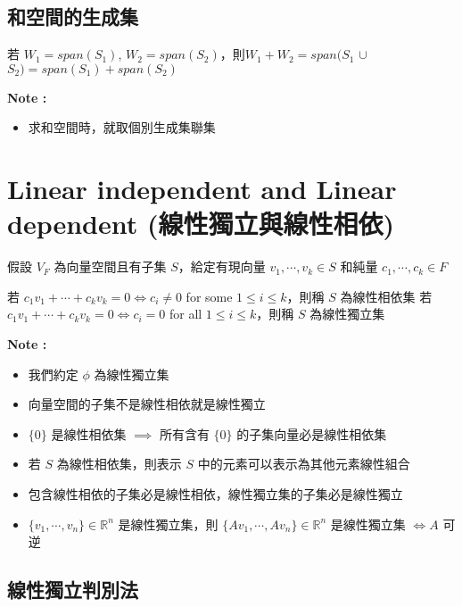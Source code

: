\documentclass[
]{book}
\providecommand{\tightlist}{%
  \setlength{\itemsep}{0pt}\setlength{\parskip}{0pt}}
\begin{document}
\hypertarget{ux548cux7a7aux9593ux7684ux751fux6210ux96c6}{%
\subsection{和空間的生成集}\label{ux548cux7a7aux9593ux7684ux751fux6210ux96c6}}

若 \(W_1 = span(S_1)\), \(W_2 = span(S_2)\)，則\(W_1 + W_2 = span(S_1\) \(\cup\) \(S_2) = span(S_1) + span(S_2)\)

\textbf{Note :}

\begin{itemize}
\tightlist
\item
  求和空間時，就取個別生成集聯集
\end{itemize}

\hypertarget{linear-independent-and-linear-dependent-ux7ddaux6027ux7368ux7acbux8207ux7ddaux6027ux76f8ux4f9d}{%
\section{Linear independent and Linear dependent (線性獨立與線性相依)}\label{linear-independent-and-linear-dependent-ux7ddaux6027ux7368ux7acbux8207ux7ddaux6027ux76f8ux4f9d}}

假設 \(V_F\) 為向量空間且有子集 \(S\)，給定有現向量 \(v_1,\cdots,v_k \in S\) 和純量 \(c_1,\cdots,c_k \in F\)

若 \(c_1v_1 + \cdots + c_kv_k = 0 \iff c_i \neq 0\) for some \(1\leq i \leq k\)，則稱 \(S\) 為線性相依集
若 \(c_1v_1 + \cdots + c_kv_k = 0 \iff c_i = 0\) for all \(1\leq i \leq k\)，則稱 \(S\) 為線性獨立集

\textbf{Note :}

\begin{itemize}
\tightlist
\item
  我們約定 \(\phi\) 為線性獨立集
\item
  向量空間的子集不是線性相依就是線性獨立
\item
  \(\{0\}\) 是線性相依集 \(\implies\) 所有含有 \(\{0\}\) 的子集向量必是線性相依集
\item
  若 \(S\) 為線性相依集，則表示 \(S\) 中的元素可以表示為其他元素線性組合
\item
  包含線性相依的子集必是線性相依，線性獨立集的子集必是線性獨立
\item
  \(\{v_1,\cdots,v_n\} \in \mathbb{R}^n\) 是線性獨立集，則 \(\{Av_1,\cdots,Av_n\} \in \mathbb{R}^n\) 是線性獨立集 \(\iff A\) 可逆
\end{itemize}

\hypertarget{ux7ddaux6027ux7368ux7acbux5224ux5225ux6cd5}{%
\subsection{線性獨立判別法}\label{ux7ddaux6027ux7368ux7acbux5224ux5225ux6cd5}}
\end{document}
